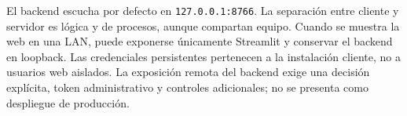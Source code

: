 El backend escucha por defecto en \nolinkurl{127.0.0.1:8766}. La separación entre cliente y servidor es lógica y de procesos, aunque compartan equipo. Cuando se muestra la web en una LAN, puede exponerse únicamente Streamlit y conservar el backend en loopback. Las credenciales persistentes pertenecen a la instalación cliente, no a usuarios web aislados. La exposición remota del backend exige una decisión explícita, token administrativo y controles adicionales; no se presenta como despliegue de producción.
